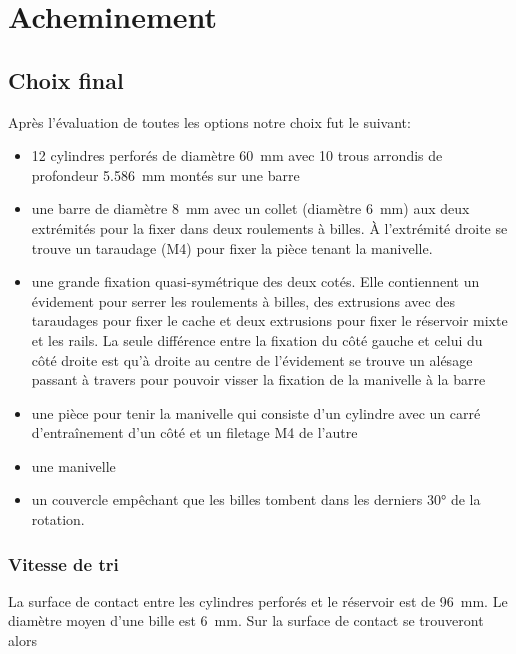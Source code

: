 \section{Acheminement}
\subsection{Choix final}
Après l'évaluation de toutes les options notre choix fut le suivant:
\begin{itemize}
	\item \num{12} cylindres perforés de diamètre \SI{60}{\milli\metre} avec \num{10} trous arrondis de profondeur \SI{5.586}{\milli\metre} montés sur une barre
	\item une barre de diamètre \SI{8}{\milli\metre} avec un collet (diamètre \SI{6}{\milli\metre}) aux deux extrémités pour la fixer dans deux roulements à billes. À l'extrémité droite se trouve un taraudage (M4) pour fixer la pièce tenant la manivelle.
	\item une grande fixation quasi-symétrique des deux cotés. Elle contiennent un évidement pour serrer les roulements à billes, des extrusions avec des taraudages pour fixer le cache et deux extrusions pour fixer le réservoir mixte et les rails. La seule différence entre la fixation du côté gauche et celui du côté droite est qu'à droite au centre de l'évidement se trouve un alésage passant à travers pour pouvoir visser la fixation de la manivelle à la barre 
	\item une pièce pour tenir la manivelle qui consiste d'un cylindre avec un carré d'entraînement d'un côté et un filetage M4 de l'autre
	\item une manivelle
	\item un couvercle empêchant que les billes tombent dans les derniers \ang{30} de la rotation.
\end{itemize}


\subsubsection{Vitesse de tri}
La surface de contact entre les cylindres perforés et le réservoir est de \SI{96}{\milli\metre}. Le diamètre moyen d'une bille est \SI{6}{\milli\metre}. Sur la surface de contact se trouveront alors

